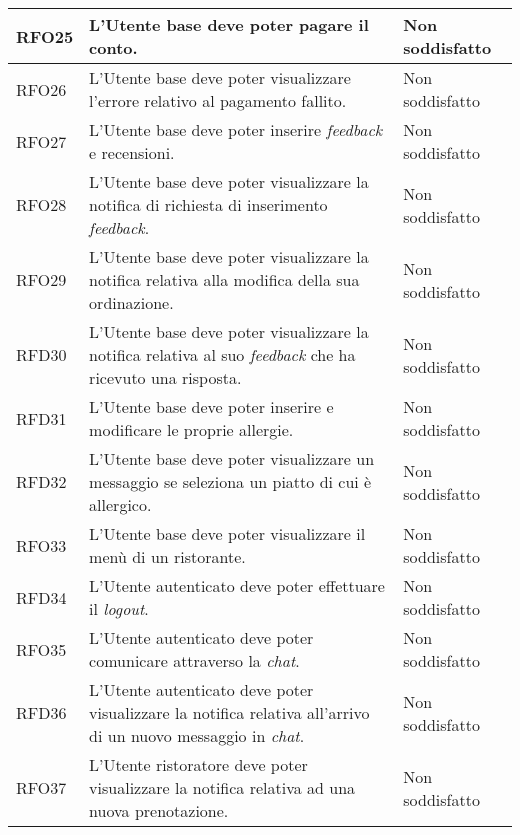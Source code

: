 \begin{longtable}{|l|p{}|p{3cm}|}
	\hline
	RFO25       & L'Utente base deve poter pagare il conto.                                                                               & Non soddisfatto \\
	\hline
	RFO26       & L'Utente base deve poter visualizzare l'errore relativo al pagamento fallito.                                           & Non soddisfatto \\
	\hline
	RFO27       & L'Utente base deve poter inserire \textit{feedback} e recensioni.                                                       & Non soddisfatto \\
	\hline
	RFO28       & L'Utente base deve poter visualizzare la notifica di richiesta di inserimento \textit{feedback}.                        & Non soddisfatto \\
	\hline
	RFO29       & L'Utente base deve poter visualizzare la notifica relativa alla modifica della sua ordinazione.                         & Non soddisfatto \\
	\hline
	RFD30       & L'Utente base deve poter visualizzare la notifica relativa al suo \textit{feedback} che ha ricevuto una risposta.       & Non soddisfatto \\
	\hline
	RFD31       & L'Utente base deve poter inserire e modificare le proprie allergie.                                                     & Non soddisfatto \\
	\hline
	RFD32       & L'Utente base deve poter visualizzare un messaggio se seleziona un piatto di cui è allergico.                        & Non soddisfatto \\
	\hline
	RFO33       & L'Utente base deve poter visualizzare il menù di un ristorante.                                                      & Non soddisfatto \\
	\hline
	RFD34       & L'Utente autenticato deve poter effettuare il \textit{logout}.                                                       & Non soddisfatto \\
	\hline
	RFO35       & L'Utente autenticato deve poter comunicare attraverso la \textit{chat}.                                              & Non soddisfatto \\
	\hline
	RFD36       & L'Utente autenticato deve poter visualizzare la notifica relativa all'arrivo di un nuovo messaggio in \textit{chat}. & Non soddisfatto \\
	\hline
	RFO37       & L'Utente ristoratore deve poter visualizzare la notifica relativa ad una nuova prenotazione.                         & Non soddisfatto \\

\end{longtable}
